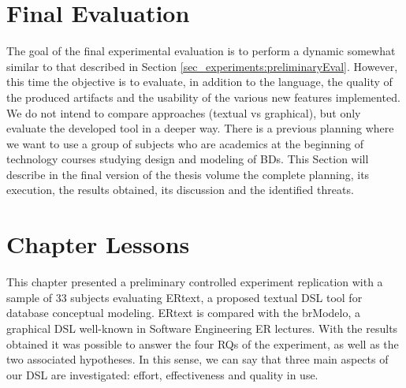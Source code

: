 \section{Final Evaluation} 
\label{sec_experiments:finalEval}

The goal of the final experimental evaluation is to perform a dynamic somewhat similar to that described in Section \ref{sec_experiments:preliminaryEval}.
However, this time the objective is to evaluate, in addition to the language, the quality of the produced artifacts and the usability of the various new features implemented.
We do not intend to compare approaches (textual vs graphical), but only evaluate the developed tool in a deeper way.
There is a previous planning where we want to use a group of subjects who are academics at the beginning of technology courses studying design and modeling of BDs.
This Section will describe in the final version of the thesis volume the complete planning, its execution, the results obtained, its discussion and the identified threats.

\section{Chapter Lessons}
\label{sec_experiments:lessons}

This chapter presented a preliminary controlled experiment replication with a sample of 33 subjects evaluating ERtext, a proposed textual DSL tool for database conceptual modeling. 
ERtext is compared with the brModelo, a graphical DSL well-known in Software Engineering ER lectures. 
With the results obtained it was possible to answer the four RQs of the experiment, as well as the two associated hypotheses.
In this sense, we can say that three main aspects of our DSL are investigated: effort, effectiveness and quality in use. 


